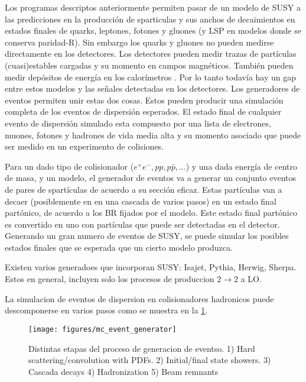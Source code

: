 Los programas descriptos anteriormente permiten pasar de un modelo de SUSY a las
predicciones en la producción de sparticulas y sus anchos de decaimientos en
estados finales de quarks, leptones, fotones y gluones (y LSP en modelos donde
se conserva paridad-R). Sin embargo los quarks y gluones no pueden medirse
directamente en los detectores. Los detectores pueden medir trazas de partículas
(cuasi)estables cargadas y su momento en campos magnéticos. También pueden medir
depósitos de energía en los calorímetros . Por lo tanto todavía hay un gap entre
estos modelos y las señales detectadas en los detectores. Los generadores de
eventos permiten unir estas dos cosas. Estos pueden producir una simulación
completa de los eventos de dispersión esperados. El estado final de cualquier
evento de dispersión simulado esta compuesto por una lista de electrones,
muones, fotones y hadrones de vida media alta y su momento asociado que puede
ser medido en un experimento de colisiones.

Para un dado tipo de colisionador ($e^+e^-, pp, p\bar{p}, ...$) y una dada
energía de centro de masa, y un modelo, el generador de eventos va a generar un
conjunto eventos de pares de spartículas de acuerdo a su sección eficaz. Estas
partículas van a decaer (posiblemente en en una cascada de varios pasos) en un
estado final partónico, de acuerdo a los BR fijados por el modelo. Este estado
final partónico es convertido en uno con partículas que puede ser detectadas en
el detector. Generando un gran numero de eventos de SUSY, se puede simular los
posibles estados finales que se esperada que un cierto modelo produzca.


Existen varios generadoes que incorporan SUSY: Isajet, Pythia, Herwig, Sherpa.
Estos en general, incluyen solo los procesos de produccion $2\to 2$ a LO.

La simulacion de eventos de dispersion en colisionadores hadronicos
puede descomponerse en varios pasos como se muestra en la \cref{fig:mc_event_generator}.

\begin{figure}[h]
  \centering
  \texttt{[image: figures/mc\_event\_generator]}
  \caption{Distintas etapas del proceso de generacion de eventso.
    1) Hard scattering/convolution with PDFs.
    2) Initial/final state showers.
    3) Cascada decays
    4) Hadronization
    5) Beam remnants}
  \label{fig:mc_event_generator}
\end{figure}


